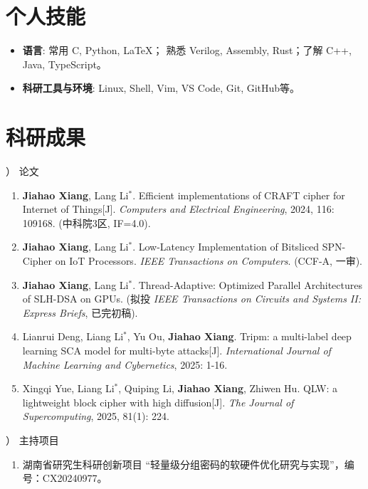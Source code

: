 \documentclass[12pt,a4paper]{article}
\begin{document}
\section*{个人技能}
{
  \begin{itemize}[leftmargin=2em]
    \item \textbf{语言}: 常用 C, Python, \LaTeX； 熟悉 Verilog, Assembly, Rust；了解 C++, Java, TypeScript。
    \item \textbf{科研工具与环境}: Linux, Shell, Vim, VS Code, Git, GitHub等。
  \end{itemize}
}

\section*{科研成果}
） 论文
\begin{enumerate}[leftmargin=2em]
  \item \textbf{Jiahao Xiang}, Lang Li$^*$. Efficient implementations of CRAFT cipher for Internet of Things[J]. \textit{Computers and Electrical Engineering}, 2024, 116: 109168. (中科院3区, IF=4.0).
  \item \textbf{Jiahao Xiang}, Lang Li$^*$. Low-Latency Implementation of Bitsliced SPN-Cipher on IoT Processors. \textit{IEEE Transactions on Computers}. (CCF-A, 一审).
  \item \textbf{Jiahao Xiang}, Lang Li$^*$. Thread-Adaptive: Optimized Parallel Architectures of SLH-DSA on GPUs. (拟投 \textit{IEEE Transactions on Circuits and Systems II: Express Briefs}, 已完初稿).
  \item Lianrui Deng, Liang Li$^*$, Yu Ou, \textbf{Jiahao Xiang}. Tripm: a multi-label deep learning SCA model for multi-byte attacks[J]. \textit{International Journal of Machine Learning and Cybernetics}, 2025: 1-16.
  \item Xingqi Yue, Liang Li$^*$, Quiping Li, \textbf{Jiahao Xiang}, Zhiwen Hu. QLW: a lightweight block cipher with high diffusion[J]. \textit{The Journal of Supercomputing}, 2025, 81(1): 224.
\end{enumerate}

） 主持项目

\begin{enumerate}[leftmargin=2em]
  \item 湖南省研究生科研创新项目 ``轻量级分组密码的软硬件优化研究与实现''，编号：CX20240977。
\end{enumerate}
\end{document}
